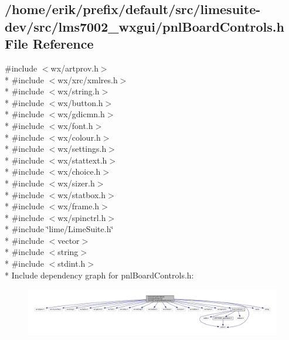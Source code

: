 \subsection{/home/erik/prefix/default/src/limesuite-\/dev/src/lms7002\+\_\+wxgui/pnl\+Board\+Controls.h File Reference}
\label{pnlBoardControls_8h}
{\ttfamily \#include $<$wx/artprov.\+h$>$}\\*
{\ttfamily \#include $<$wx/xrc/xmlres.\+h$>$}\\*
{\ttfamily \#include $<$wx/string.\+h$>$}\\*
{\ttfamily \#include $<$wx/button.\+h$>$}\\*
{\ttfamily \#include $<$wx/gdicmn.\+h$>$}\\*
{\ttfamily \#include $<$wx/font.\+h$>$}\\*
{\ttfamily \#include $<$wx/colour.\+h$>$}\\*
{\ttfamily \#include $<$wx/settings.\+h$>$}\\*
{\ttfamily \#include $<$wx/stattext.\+h$>$}\\*
{\ttfamily \#include $<$wx/choice.\+h$>$}\\*
{\ttfamily \#include $<$wx/sizer.\+h$>$}\\*
{\ttfamily \#include $<$wx/statbox.\+h$>$}\\*
{\ttfamily \#include $<$wx/frame.\+h$>$}\\*
{\ttfamily \#include $<$wx/spinctrl.\+h$>$}\\*
{\ttfamily \#include \char`\"{}lime/\+Lime\+Suite.\+h\char`\"{}}\\*
{\ttfamily \#include $<$vector$>$}\\*
{\ttfamily \#include $<$string$>$}\\*
{\ttfamily \#include $<$stdint.\+h$>$}\\*
Include dependency graph for pnl\+Board\+Controls.\+h\+:
\nopagebreak
\begin{figure}[H]
\begin{center}
\leavevmode
\includegraphics[width=350pt]{df/d88/pnlBoardControls_8h__incl}
\end{center}
\end{figure}
